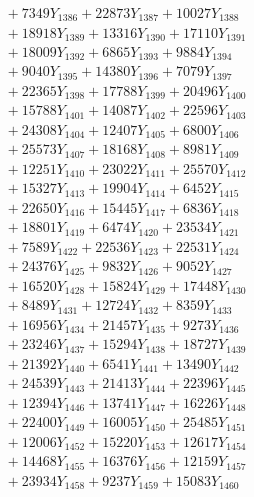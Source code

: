 \documentclass[a4paper,10pt]{article}
\begin{document}
{\begin{align}
&\;  + 7349 Y_{1386} + 22873 Y_{1387} + 10027 Y_{1388} \\[0.3ex]
&\;  + 18918 Y_{1389} + 13316 Y_{1390} + 17110 Y_{1391} \\[0.3ex]
&\;  + 18009 Y_{1392} + 6865 Y_{1393} + 9884 Y_{1394} \\[0.3ex]
&\;  + 9040 Y_{1395} + 14380 Y_{1396} + 7079 Y_{1397} \\[0.3ex]
&\;  + 22365 Y_{1398} + 17788 Y_{1399} + 20496 Y_{1400} \\[0.3ex]
&\;  + 15788 Y_{1401} + 14087 Y_{1402} + 22596 Y_{1403} \\[0.3ex]
&\;  + 24308 Y_{1404} + 12407 Y_{1405} + 6800 Y_{1406} \\[0.3ex]
&\;  + 25573 Y_{1407} + 18168 Y_{1408} + 8981 Y_{1409} \\[0.5ex]\allowbreak
&\;  + 12251 Y_{1410} + 23022 Y_{1411} + 25570 Y_{1412} \\[0.3ex]
&\;  + 15327 Y_{1413} + 19904 Y_{1414} + 6452 Y_{1415} \\[0.3ex]
&\;  + 22650 Y_{1416} + 15445 Y_{1417} + 6836 Y_{1418} \\[0.3ex]
&\;  + 18801 Y_{1419} + 6474 Y_{1420} + 23534 Y_{1421} \\[0.3ex]
&\;  + 7589 Y_{1422} + 22536 Y_{1423} + 22531 Y_{1424} \\[0.3ex]
&\;  + 24376 Y_{1425} + 9832 Y_{1426} + 9052 Y_{1427} \\[0.3ex]
&\;  + 16520 Y_{1428} + 15824 Y_{1429} + 17448 Y_{1430} \\[0.3ex]
&\;  + 8489 Y_{1431} + 12724 Y_{1432} + 8359 Y_{1433} \\[0.3ex]
&\;  + 16956 Y_{1434} + 21457 Y_{1435} + 9273 Y_{1436} \\[0.3ex]
&\;  + 23246 Y_{1437} + 15294 Y_{1438} + 18727 Y_{1439} \\[0.5ex]\allowbreak
&\;  + 21392 Y_{1440} + 6541 Y_{1441} + 13490 Y_{1442} \\[0.3ex]
&\;  + 24539 Y_{1443} + 21413 Y_{1444} + 22396 Y_{1445} \\[0.3ex]
&\;  + 12394 Y_{1446} + 13741 Y_{1447} + 16226 Y_{1448} \\[0.3ex]
&\;  + 22400 Y_{1449} + 16005 Y_{1450} + 25485 Y_{1451} \\[0.3ex]
&\;  + 12006 Y_{1452} + 15220 Y_{1453} + 12617 Y_{1454} \\[0.3ex]
&\;  + 14468 Y_{1455} + 16376 Y_{1456} + 12159 Y_{1457} \\[0.3ex]
&\;  + 23934 Y_{1458} + 9237 Y_{1459} + 15083 Y_{1460} \\[0.3ex]

\end{align}}
\end{document}
